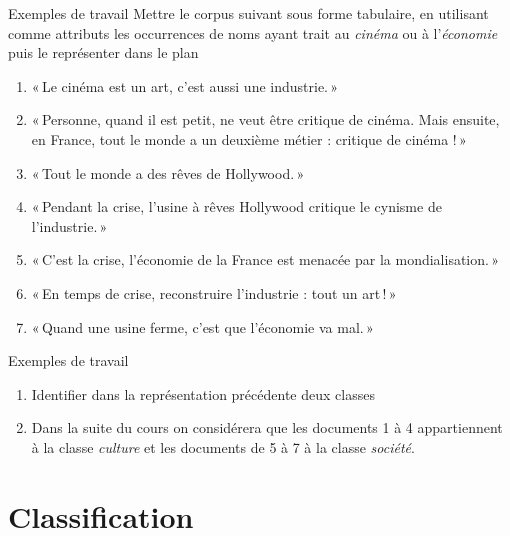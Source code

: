 \documentclass[../allslides.tex]{subfiles}
\begin{document}
\renewcommand\docdate{2021-02-18}  %



\begin{frame}{Exemples de travail}
	Mettre le corpus suivant sous forme tabulaire, en utilisant comme attributs les occurrences de noms ayant trait au \emph{cinéma} ou à l'\emph{économie} puis le représenter dans le plan
	{\small
		\begin{enumerate}
			\item « Le cinéma est un art, c’est aussi une industrie. »
			\item « Personne, quand il est petit, ne veut être critique de cinéma. Mais ensuite, en France, tout le monde a un deuxième métier : critique de cinéma ! »
			\item « Tout le monde a des rêves de Hollywood. »
			\item « Pendant la crise, l’usine à rêves Hollywood critique le cynisme de l’industrie. »
			\item « C’est la crise, l’économie de la France est menacée par la mondialisation. »
			\item « En temps de crise, reconstruire l’industrie : tout un art ! »
			\item « Quand une usine ferme, c’est que l’économie va mal. »
		\end{enumerate}
	}
\end{frame}

\begin{frame}{Exemples de travail}
	\begin{enumerate}
		\item<+-> Identifier dans la représentation précédente deux classes
		\item<+-> Dans la suite du cours on considérera que les documents 1 à 4 appartiennent à la classe \emph{culture} et les documents de 5 à 7 à la classe \emph{société}.
	\end{enumerate}
\end{frame}

\section{Classification}
\end{document}
